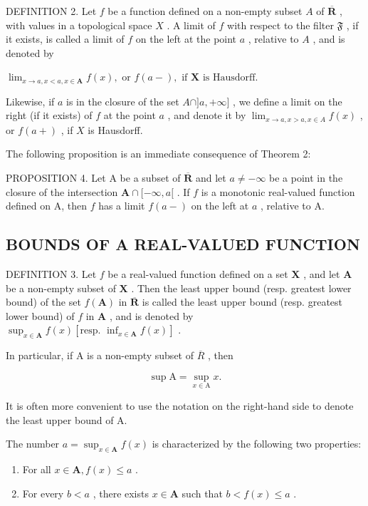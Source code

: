 DEFINITION 2. Let \(f\) be a function defined on a non-empty subset \(A\) of \(\overline{\mathbf{R}}\) , with values in a topological space \(X\) . A limit of \(f\) with respect to the filter \(\mathfrak{F}\) , if it exists, is called a limit of \(f\) on the left at the point \(a\) , relative to \(A\) , and is denoted by

\(\lim_{x \to a, x < a, x \in \mathbf{A}} f(x), \text{ or } f(a - ), \text{ if } \mathbf{X} \text{ is Hausdorff.}\)

Likewise, if \(a\) is in the closure of the set \(A \cap ]a, +\infty]\) , we define a limit on the right (if it exists) of \(f\) at the point \(a\) , and denote it by \(\lim_{x \to a, x > a, x \in A} f(x)\) , or \(f(a+)\) , if \(X\) is Hausdorff.

The following proposition is an immediate consequence of Theorem 2:

PROPOSITION 4. Let A be a subset of \(\overline{\mathbf{R}}\) and let \(a \neq -\infty\) be a point in the closure of the intersection \(\mathbf{A} \cap [-\infty, a[\) . If \(f\) is a monotonic real-valued function defined on A, then \(f\) has a limit \(f(a - )\) on the left at \(a\) , relative to A.

\subsection{BOUNDS OF A REAL-VALUED FUNCTION}

DEFINITION 3. Let \(f\) be a real-valued function defined on a set \(\mathbf{X}\) , and let \(\mathbf{A}\) be a non-empty subset of \(\mathbf{X}\) . Then the least upper bound (resp. greatest lower bound) of the set \(f(\mathbf{A})\) in \(\overline{\mathbf{R}}\) is called the least upper bound (resp. greatest lower bound) of \(f\) in \(\mathbf{A}\) , and is denoted by \(\sup_{x\in \mathbf{A}}f(x)\left[\text{resp. } \inf_{x\in \mathbf{A}} f(x)\right]\) .

In particular, if A is a non-empty subset of \(\overline{R}\) , then

\[
\sup \mathrm{A} = \sup _ {x \in \mathrm{A}} x.\tag{1}
\]

It is often more convenient to use the notation on the right-hand side to denote the least upper bound of A.

The number \(a = \sup_{x \in \mathbf{A}} f(x)\) is characterized by the following two properties:

\begin{enumerate}
\def\labelenumi{(\roman{enumi})}
\item
  For all \(x \in \mathbf{A}, f(x) \leqslant a\) .
\item
  For every \(b < a\) , there exists \(x \in \mathbf{A}\) such that \(b < f(x) \leqslant a\) .
\end{enumerate}


